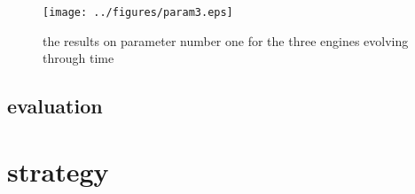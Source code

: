 \documentclass[]{lofar}
\begin{document}
      \begin{figure}
        \texttt{[image: ../figures/param3.eps]}
        \label{param3}\hypertarget{param3}{}%
        \caption{the results on parameter number one for the three engines evolving through time}
      \end{figure}

    \subsection{evaluation}
    \label{subsection-evaluation}\hypertarget{subsection-evaluation}{}%



\newcommand{\dbappendix}[1]{\section{#1}}%

  \appendix

  \dbappendix{strategy}
  \label{start script}\hypertarget{start script}{}%
\end{document}
